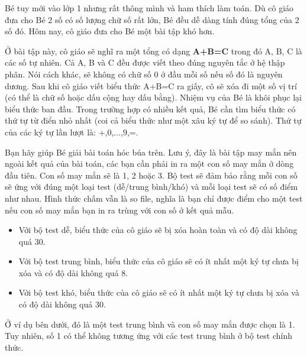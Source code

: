 Bé tuy mới vào lớp 1 nhưng rất thông mình và ham thích làm toán. Dù cô giáo đưa cho Bé 2 số có số lượng chữ số rất lớn, Bé đều dễ dàng tính đúng tổng của 2 số đó. Hôm nay, cô giáo đưa cho Bé một bài tập khó hơn.  

   Ở bài tập này, cô giáo sẽ nghĩ ra một tổng có dạng   \textbf{    A+B=C   }   trong đó A, B, C là các số tự nhiên. Cả A, B và C đều được viết theo đúng nguyên tắc ở hệ thập phân. Nói cách khác, sẽ không có chữ số 0 ở đầu mỗi số nếu số đó là nguyên dương. Sau khi cô giáo viết biểu thức A+B=C ra giấy, cô sẽ xóa đi một số vị trí (có thể là chữ số hoặc dấu cộng hay dấu bằng). Nhiệm vụ của Bé là khôi phục lại biểu thức ban đầu. Trong trường hợp có nhiều kết quả, Bé cần tìm biểu thức có thứ tự từ điển nhỏ nhất (coi cả biểu thức như một xâu ký tự để so sánh). Thứ tự của các ký tự lần lượt là: +,0,...,9,=.  

   Bạn hãy giúp Bé giải bài toán hóc búa trên. Lưu ý, đây là bài tập may mắn nên ngoài kết quả của bài toán, các bạn cần phải in ra một con số may mắn ở dòng đầu tiên. Con số may mắn sẽ là 1, 2 hoặc 3. Bộ test sẽ đảm bảo rằng mỗi con số sẽ ứng với đúng một loại test (dễ/trung bình/khó) và mỗi loại test sẽ có số điểm như nhau. Hình thức chấm vẫn là so file, nghĩa là bạn chỉ được điểm cho một test nếu con số may mắn bạn in ra trùng với con số ở kết quả mẫu.  
\begin{itemize}
	\item     Với bộ test dễ, biểu thức của cô giáo sẽ bị xóa hoàn toàn và có độ dài không quá 30.   
\end{itemize}
\begin{itemize}
	\item     Với bộ test trung bình, biểu thức của cô giáo sẽ có ít nhất một ký tự chưa bị xóa và có độ dài không quá 8.   
\end{itemize}
\begin{itemize}
	\item     Với bộ test khó, biểu thức của cô giáo sẽ có ít nhất một ký tự chưa bị xóa và có độ dài không quá 30.   
\end{itemize}

   Ở ví dụ bên dưới, đó là một test trung bình và con số may mắn được chọn  là 1. Tuy nhiên, số 1 có thể không tương ứng với các test trung bình ở  bộ test chính thức.